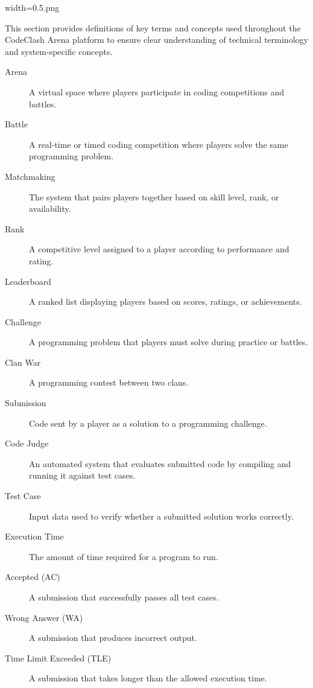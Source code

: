 width=0.5\linewidthimage.png\documentclass[12pt,a4paper]{article}
\begin{document}
This section provides definitions of key terms and concepts used throughout the CodeClash Arena platform to ensure clear understanding of technical terminology and system-specific concepts.

\begin{description}
\item[Arena] A virtual space where players participate in coding competitions and battles.

\item[Battle] A real-time or timed coding competition where players solve the same programming problem.

\item[Matchmaking] The system that pairs players together based on skill level, rank, or availability.

\item[Rank] A competitive level assigned to a player according to performance and rating.

\item[Leaderboard] A ranked list displaying players based on scores, ratings, or achievements.

\item[Challenge] A programming problem that players must solve during practice or battles.

\item[Clan War] A programming contest between two clans.

\item[Submission] Code sent by a player as a solution to a programming challenge.

\item[Code Judge] An automated system that evaluates submitted code by compiling and running it against test cases.

\item[Test Case] Input data used to verify whether a submitted solution works correctly.

\item[Execution Time] The amount of time required for a program to run.

\item[Accepted (AC)] A submission that successfully passes all test cases.

\item[Wrong Answer (WA)] A submission that produces incorrect output.

\item[Time Limit Exceeded (TLE)] A submission that takes longer than the allowed execution time.


\end{description}
\end{document}
